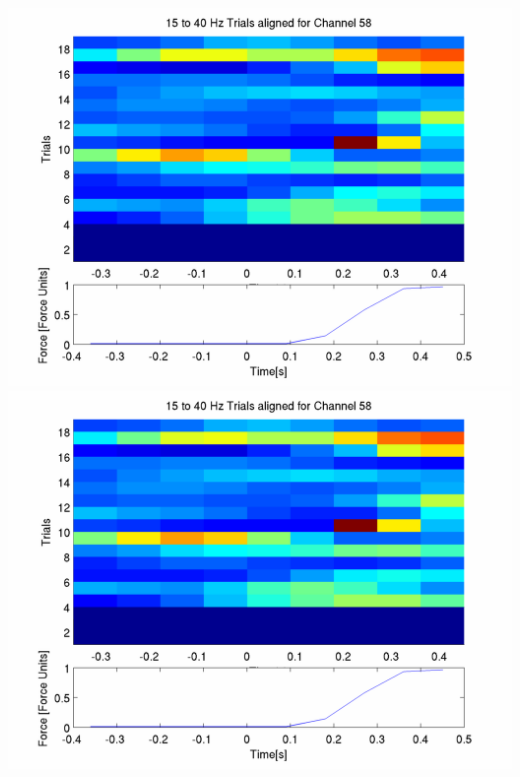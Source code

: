 \documentclass[12pt]{article}
\begin{document}
\includegraphics[scale=0.2]{noCAR/plot_6_aligned_trials.png}
\includegraphics[scale=0.2]{WithCAR/plot_6_aligned_trials.png}
\end{document}

